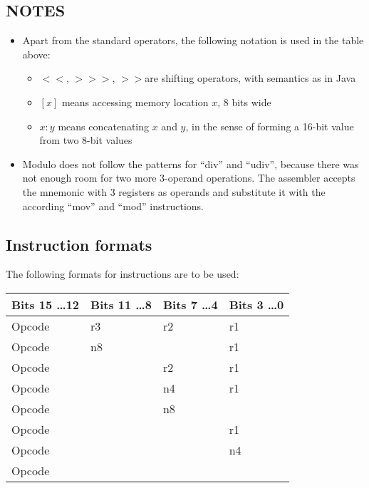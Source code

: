 \documentclass[10pt, twoside, a4paper]{article}
\newcommand{\shl}{\ensuremath{<\!\!<}}
\newcommand{\shr}{\ensuremath{>\!\!>\!\!>}}
\newcommand{\sar}{\ensuremath{>\!\!>}}
\newcommand{\at}{\ensuremath{\!\!:\!\!}}
\begin{document}
  \subsection{NOTES}
  \begin{itemize}
  \item Apart from the standard operators, the following notation is
    used in the table above:
    \begin{itemize}
    \item \shl, \shr, \sar are shifting operators, with semantics as in Java
    \item $[x]$ means accessing memory location $x$, 8 bits wide
    \item $x \at y$ means concatenating $x$ and $y$, in the sense of
      forming a 16-bit value from two 8-bit values
    \end{itemize}
  \item Modulo does not follow the patterns for ``div'' and ``udiv'',
    because there was not enough room for two more 3-operand
    operations. The assembler accepts the mnemonic with 3 registers as
    operands and substitute it with the according ``mov'' and ``mod''
    instructions.
  \end{itemize}

  \clearpage

  \subsection{Instruction formats}

  The following formats for instructions are to be used:

  \begin{center}
    \begin{tabular}{|p{1in}|p{1in}|p{1in}|p{1in}|}
      \hline
      Bits 15 \ldots 12 & Bits 11 \ldots 8 & Bits 7 \ldots 4 & Bits 3 \ldots 0 \\
      \hline
      Opcode                & r3   & r2 & r1 \\
      \hline
      Opcode                & \multicolumn{2}{|l|}{n8} & r1 \\
      \hline
      \multicolumn{2}{|l|}{Opcode} & r2 & r1 \\
      \hline
      \multicolumn{2}{|l|}{Opcode} & n4 & r1 \\
      \hline
      \multicolumn{2}{|l|}{Opcode} & \multicolumn{2}{|l|}{n8} \\
      \hline
      \multicolumn{3}{|l|}{Opcode} & r1 \\
      \hline
      \multicolumn{3}{|l|}{Opcode} & n4 \\
      \hline
      \multicolumn{4}{|l|}{Opcode} \\
      \hline
    \end{tabular}
  \end{center}
\end{document}
